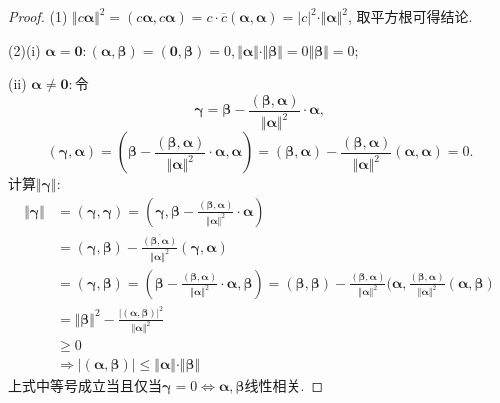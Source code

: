 \begin{proof}
  (1) $\Vert c\bm{\alpha}\Vert^2=(c\bm{\alpha},c\bm{\alpha})=
  c\cdot\overline{c}(\bm{\alpha},\bm{\alpha})=|c|^2\cdot\Vert\bm{\alpha}\Vert^2$,
  取平方根可得结论.

  (2)(i) $\bm{\alpha}=\bm{0}: (\bm{\alpha},\bm{\beta})=(\bm{0},\bm{\beta})=0,
  \Vert\bm{\alpha}\Vert\cdot\Vert\bm{\beta}\Vert=0\Vert{\bm{\beta}}\Vert=0$;

  (ii) $\bm{\alpha \neq 0:}$令
  \[ \bm{\gamma}=\bm{\beta}-\frac{(\bm{\beta},
      \bm{\alpha})}{\Vert\bm{\alpha}\Vert^2}\cdot\bm{\alpha}, \]
  \[ (\bm{\gamma},\bm{\alpha}) = \left(\bm{\beta}-\frac{(\bm{\beta},
        \bm{\alpha})}{\Vert\bm{\alpha}\Vert^2}\cdot\bm{\alpha}, \bm{\alpha}\right)
    = (\bm{\beta},\bm{\alpha})-\frac{(\bm{\beta},
      \bm{\alpha})}{\Vert\bm{\alpha}\Vert^2}(\bm{\alpha},\bm{\alpha}) = 0.
  \]
  计算$\Vert\bm{\gamma}\Vert$:
  \begin{align*}
    \Vert\bm{\gamma}\Vert & = (\bm{\gamma},\bm{\gamma})
                            = (\bm{\gamma}, \bm{\beta}-\frac{(\bm{\beta},
                            \bm{\alpha})}{\Vert\bm{\alpha}\Vert^2}\cdot\bm{\alpha})\\
                          & = (\bm{\gamma},\bm{\beta}) -
                            \frac{\overline{(\bm{\beta},\bm{\alpha})}}{\Vert\bm{\alpha}\Vert^2}(\bm{\gamma},\bm{\alpha})\\
                          & = (\bm{\gamma},\bm{\beta})
                            = (\bm{\beta}-\frac{(\bm{\beta},
                            \bm{\alpha})}{\Vert\bm{\alpha}\Vert^2}\cdot\bm{\alpha},\bm{\beta})
                            = (\bm{\beta},\bm{\beta})-\frac{(\bm{\beta},
                            \bm{\alpha})}{\Vert\bm{\alpha}\Vert^2}(\bm{\alpha},\frac{(\bm{\beta},
                            \bm{\alpha})}{\Vert\bm{\alpha}\Vert^2}(\bm{\alpha},\bm{\beta})\\
                          & = \Vert\bm{\beta}\Vert^2- \frac{|(\bm{\alpha},\bm{\beta})|^2}{\Vert\bm{\alpha}\Vert^2}\\
                          & \geq 0\\
    & \Longrightarrow |(\bm{\alpha},\bm{\beta})| \leq \Vert\bm{\alpha}\Vert\cdot\Vert\bm{\beta}\Vert
  \end{align*}
  上式中等号成立当且仅当$\bm{\gamma}=0 \Longleftrightarrow \bm{\alpha}, \bm{\beta}$线性相关.


\end{proof}
